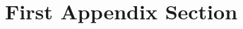 
\Appendix
\label{ch:Appendix}



\section{First Appendix Section}
		\label{Anhang-Implementierung}



